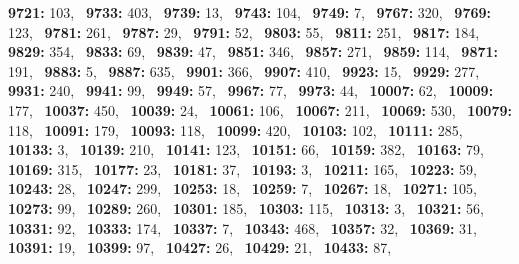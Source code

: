 \textbf{9721:} 103,\allowbreak~ 
\textbf{9733:} 403,\allowbreak~ 
\textbf{9739:} 13,\allowbreak~ 
\textbf{9743:} 104,\allowbreak~ 
\textbf{9749:} 7,\allowbreak~ 
\textbf{9767:} 320,\allowbreak~ 
\textbf{9769:} 123,\allowbreak~ 
\textbf{9781:} 261,\allowbreak~ 
\textbf{9787:} 29,\allowbreak~ 
\textbf{9791:} 52,\allowbreak~ 
\textbf{9803:} 55,\allowbreak~ 
\textbf{9811:} 251,\allowbreak~ 
\textbf{9817:} 184,\allowbreak~ 
\textbf{9829:} 354,\allowbreak~ 
\textbf{9833:} 69,\allowbreak~ 
\textbf{9839:} 47,\allowbreak~ 
\textbf{9851:} 346,\allowbreak~ 
\textbf{9857:} 271,\allowbreak~ 
\textbf{9859:} 114,\allowbreak~ 
\textbf{9871:} 191,\allowbreak~ 
\textbf{9883:} 5,\allowbreak~ 
\textbf{9887:} 635,\allowbreak~ 
\textbf{9901:} 366,\allowbreak~ 
\textbf{9907:} 410,\allowbreak~ 
\textbf{9923:} 15,\allowbreak~ 
\textbf{9929:} 277,\allowbreak~ 
\textbf{9931:} 240,\allowbreak~ 
\textbf{9941:} 99,\allowbreak~ 
\textbf{9949:} 57,\allowbreak~ 
\textbf{9967:} 77,\allowbreak~ 
\textbf{9973:} 44,\allowbreak~ 
\textbf{10007:} 62,\allowbreak~ 
\textbf{10009:} 177,\allowbreak~ 
\textbf{10037:} 450,\allowbreak~ 
\textbf{10039:} 24,\allowbreak~ 
\textbf{10061:} 106,\allowbreak~ 
\textbf{10067:} 211,\allowbreak~ 
\textbf{10069:} 530,\allowbreak~ 
\textbf{10079:} 118,\allowbreak~ 
\textbf{10091:} 179,\allowbreak~ 
\textbf{10093:} 118,\allowbreak~ 
\textbf{10099:} 420,\allowbreak~ 
\textbf{10103:} 102,\allowbreak~ 
\textbf{10111:} 285,\allowbreak~ 
\textbf{10133:} 3,\allowbreak~ 
\textbf{10139:} 210,\allowbreak~ 
\textbf{10141:} 123,\allowbreak~ 
\textbf{10151:} 66,\allowbreak~ 
\textbf{10159:} 382,\allowbreak~ 
\textbf{10163:} 79,\allowbreak~ 
\textbf{10169:} 315,\allowbreak~ 
\textbf{10177:} 23,\allowbreak~ 
\textbf{10181:} 37,\allowbreak~ 
\textbf{10193:} 3,\allowbreak~ 
\textbf{10211:} 165,\allowbreak~ 
\textbf{10223:} 59,\allowbreak~ 
\textbf{10243:} 28,\allowbreak~ 
\textbf{10247:} 299,\allowbreak~ 
\textbf{10253:} 18,\allowbreak~ 
\textbf{10259:} 7,\allowbreak~ 
\textbf{10267:} 18,\allowbreak~ 
\textbf{10271:} 105,\allowbreak~ 
\textbf{10273:} 99,\allowbreak~ 
\textbf{10289:} 260,\allowbreak~ 
\textbf{10301:} 185,\allowbreak~ 
\textbf{10303:} 115,\allowbreak~ 
\textbf{10313:} 3,\allowbreak~ 
\textbf{10321:} 56,\allowbreak~ 
\textbf{10331:} 92,\allowbreak~ 
\textbf{10333:} 174,\allowbreak~ 
\textbf{10337:} 7,\allowbreak~ 
\textbf{10343:} 468,\allowbreak~ 
\textbf{10357:} 32,\allowbreak~ 
\textbf{10369:} 31,\allowbreak~ 
\textbf{10391:} 19,\allowbreak~ 
\textbf{10399:} 97,\allowbreak~ 
\textbf{10427:} 26,\allowbreak~ 
\textbf{10429:} 21,\allowbreak~ 
\textbf{10433:} 87,\allowbreak~ 
